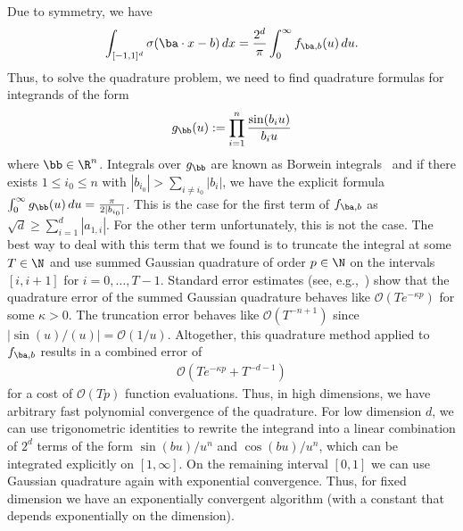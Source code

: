 \documentclass{amsart}[11pt]
\numberwithin{equation}{section}
\newcommand{\order}{\mathcal{O}}
\numberwithin{theorem}{section}
\begin{document}
Due to symmetry, we have
\begin{align*}
    \int_{[-1,1]^d} \sigma(\ba\cdot x - b)\,dx = \frac{2^{d}}{\pi}\int_{0}^\infty f_{\ba,b}(u)\,du.
\end{align*}
Thus, to solve the quadrature problem, we need to find quadrature formulas for integrands of the form
\begin{align*}
g_\bb(u):= \prod_{i=1}^n \frac{\sin(b_{i} u)}{b_iu}
\end{align*}
where $\bb\in \R^n$. Integrals over $g_\bb$ are known as Borwein integrals~\cite{borwein} and if there exists $1\leq i_0\leq n$ with $|b_{i_0}|> \sum_{i\neq i_0} |b_i|$, we 
have the explicit formula $\int_0^\infty g_\bb(u)\,du = \frac{\pi}{2|b_{i_0}|}$.
This is the case for the first term of $f_{\ba,b}$ as $\sqrt{d}\geq\sum_{i=1}^d |a_{1,i}|$. 
For the other term unfortunately, this is not the case. 
The best way to deal with this term that we found is to truncate the integral at some $T\in\N$ and use  summed Gaussian quadrature of order $p\in\N$ on the intervals $[i,i+1]$ for $i=0,\ldots,T-1$.
Standard error estimates (see, e.g.,~\cite[ Eqn. (4.6.1.11]{quadrature}) show that the quadrature error of the summed Gaussian quadrature behaves like
$\order(T e^{-\kappa p})$ for some $\kappa>0$. The truncation error behaves like $\order(T^{-n+1})$ since $|\sin(u)/(u)|=\order(1/u)$. Altogether, this quadrature method applied to $f_{\ba,b}$ results in a combined error of
\begin{align*}
\order\left(T e^{-\kappa p} + T^{-d-1}\right)
\end{align*}
for a cost of $\order(Tp)$ function evaluations. Thus, in high dimensions, we have arbitrary fast polynomial convergence of the quadrature. For low dimension $d$, we can use trigonometric identities to rewrite the integrand into a linear combination of $2^d$ terms of the form $\sin(b u)/u^n$ and $\cos(b u)/u^n$, which can be integrated explicitly on $[1,\infty]$. On the remaining interval $[0,1]$ we can use Gaussian quadrature again with exponential convergence.  Thus, for fixed dimension we have an exponentially convergent algorithm (with a constant that depends exponentially on the dimension).
\appendix
\end{document}
